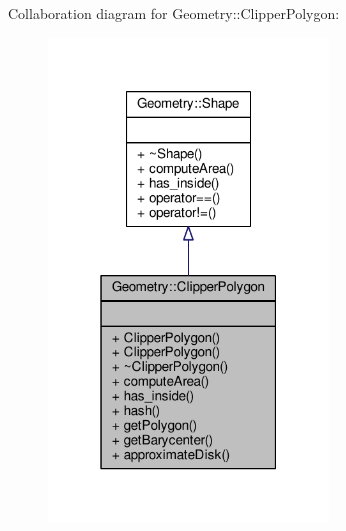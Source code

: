 Collaboration diagram for Geometry\+:\+:Clipper\+Polygon\+:\nopagebreak
\begin{figure}[H]
\begin{center}
\leavevmode
\includegraphics[width=211pt]{classGeometry_1_1ClipperPolygon__coll__graph}
\end{center}
\end{figure}
